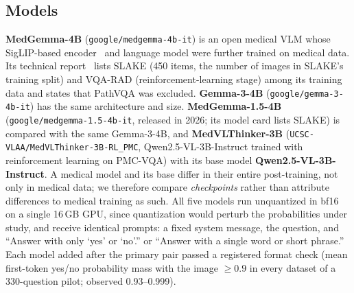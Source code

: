 \documentclass[10pt,twocolumn,letterpaper]{article}
\begin{document}
\subsection{Models}
\textbf{MedGemma-4B} (\texttt{google/medgemma-4b-it}) is an open medical VLM whose SigLIP-based
encoder~\cite{zhai2023siglip} and language model were further trained on medical data. Its technical
report~\cite{sellergren2025medgemma} lists SLAKE (450 items, the number of images in SLAKE's training split) and VQA-RAD
(reinforcement-learning stage) among its training data and states that PathVQA was excluded.
\textbf{Gemma-3-4B} (\texttt{google/gemma-3-4b-it}) has the same architecture and size. \textbf{MedGemma-1.5-4B}
(\texttt{google/medgemma-1.5-4b-it}, released in 2026; its model card lists SLAKE) is compared with the same
Gemma-3-4B, and \textbf{MedVLThinker-3B} (\texttt{UCSC-VLAA/MedVLThinker-3B-RL\_PMC}, Qwen2.5-VL-3B-Instruct
trained with reinforcement learning on PMC-VQA) with its base model \textbf{Qwen2.5-VL-3B-Instruct}. A medical
model and its base differ in their entire post-training, not only in medical data; we therefore compare
\emph{checkpoints} rather than attribute differences to medical training as such. All five models run unquantized
in bf16 on a single 16\,GB GPU, since quantization would perturb the probabilities under study, and receive
identical prompts: a fixed system message, the question, and ``Answer with only `yes' or `no'.'' or ``Answer with
a single word or short phrase.'' Each model added after the primary pair passed a registered format check
(mean first-token yes/no probability mass with the image $\ge0.9$ in every dataset of a 330-question pilot;
observed 0.93--0.999).
\end{document}

